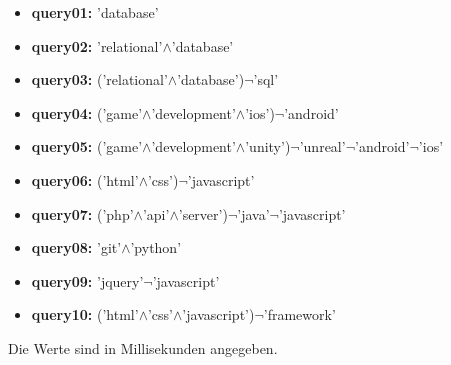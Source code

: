 \documentclass[a4paper]{scrartcl}
\begin{document}
\begin{itemize}
	\item \textbf{query01:} 'database'
	\item \textbf{query02:} 'relational'$\land$'database'
	\item \textbf{query03:} ('relational'$\land$'database')$\neg$'sql'
	\item \textbf{query04:} ('game'$\land$'development'$\land$'ios')$\neg$'android'
	\item \textbf{query05:} ('game'$\land$'development'$\land$'unity')$\neg$'unreal'$\neg$'android'$\neg$'ios'
	\item \textbf{query06:} ('html'$\land$'css')$\neg$'javascript'
	\item \textbf{query07:} ('php'$\land$'api'$\land$'server')$\neg$'java'$\neg$'javascript'
	\item \textbf{query08:} 'git'$\land$'python'
	\item \textbf{query09:} 'jquery'$\neg$'javascript'
	\item \textbf{query10:} ('html'$\land$'css'$\land$'javascript')$\neg$'framework'
\end{itemize}
Die Werte sind in Millisekunden angegeben.
\end{document}
